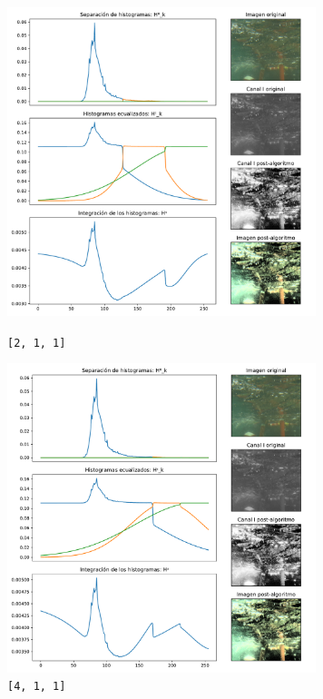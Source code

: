 \begin{figure}[H]
\begin{minipage}[c]{0.48\linewidth}
  \includegraphics[height=9cm]{imgs/1908iv-211.pdf}
  \caption{\texttt{[2, 1, 1]}}
\end{minipage}
\hfill
\begin{minipage}[c]{0.48\linewidth}
  \includegraphics[height=9cm]{imgs/1908iv-411.pdf}
  \caption{\texttt{[4, 1, 1]}}
\end{minipage}%
\end{figure}

